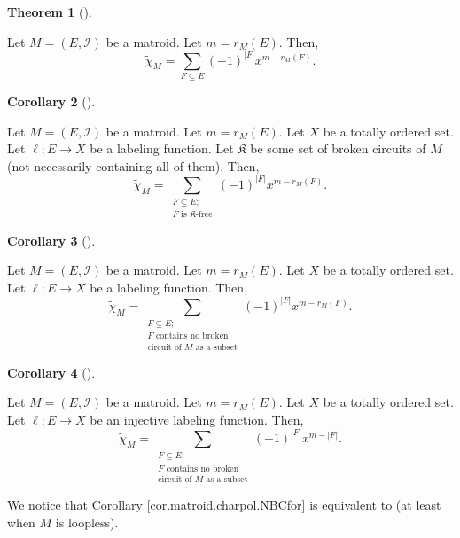 \documentclass[numbers=enddot,12pt,final,onecolumn,notitlepage]{scrartcl}%
\theoremstyle{definition}
\newtheorem{theo}{Theorem}[section]
\newenvironment{theorem}[1][]
{\begin{theo}[#1]\begin{leftbar}}
{\end{leftbar}\end{theo}}
\newtheorem{coro}[theo]{Corollary}
\newenvironment{corollary}[1][]
{\begin{coro}[#1]\begin{leftbar}}
{\end{leftbar}\end{coro}}
\let\sumnonlimits\sum
\renewcommand{\sum}{\sumnonlimits\limits}
\begin{document}
\begin{theorem}
\label{thm.matroid.charpol.empty}Let $M=\left(  E,\mathcal{I}\right)  $ be a
matroid. Let $m=r_{M}\left(  E\right)  $. Then,%
\[
\widetilde{\chi}_{M}=\sum_{F\subseteq E}\left(  -1\right)  ^{\left\vert
F\right\vert }x^{m-r_{M}\left(  F\right)  }.
\]

\end{theorem}

\begin{corollary}
\label{cor.matroid.charpol.K-free}Let $M=\left(  E,\mathcal{I}\right)  $ be a
matroid. Let $m=r_{M}\left(  E\right)  $. Let $X$ be a totally ordered set.
Let $\ell:E\rightarrow X$ be a labeling function. Let $\mathfrak{K}$ be some
set of broken circuits of $M$ (not necessarily containing all of them). Then,%
\[
\widetilde{\chi}_{M}=\sum_{\substack{F\subseteq E;\\F\text{ is }%
\mathfrak{K}\text{-free}}}\left(  -1\right)  ^{\left\vert F\right\vert
}x^{m-r_{M}\left(  F\right)  }.
\]

\end{corollary}

\begin{corollary}
\label{cor.matroid.charpol.NBC}Let $M=\left(  E,\mathcal{I}\right)  $ be a
matroid. Let $m=r_{M}\left(  E\right)  $. Let $X$ be a totally ordered set.
Let $\ell:E\rightarrow X$ be a labeling function. Then,%
\[
\widetilde{\chi}_{M}=\sum_{\substack{F\subseteq E;\\F\text{ contains no
broken}\\\text{circuit of }M\text{ as a subset}}}\left(  -1\right)
^{\left\vert F\right\vert }x^{m-r_{M}\left(  F\right)  }.
\]

\end{corollary}

\begin{corollary}
\label{cor.matroid.charpol.NBCfor}Let $M=\left(  E,\mathcal{I}\right)  $ be a
matroid. Let $m=r_{M}\left(  E\right)  $. Let $X$ be a totally ordered set.
Let $\ell:E\rightarrow X$ be an injective labeling function. Then,%
\[
\widetilde{\chi}_{M}=\sum_{\substack{F\subseteq E;\\F\text{ contains no
broken}\\\text{circuit of }M\text{ as a subset}}}\left(  -1\right)
^{\left\vert F\right\vert }x^{m-\left\vert F\right\vert }.
\]

\end{corollary}

We notice that Corollary \ref{cor.matroid.charpol.NBCfor} is equivalent to
\cite[Theorem 4.12]{Stanley} (at least when $M$ is loopless).
\end{document}
